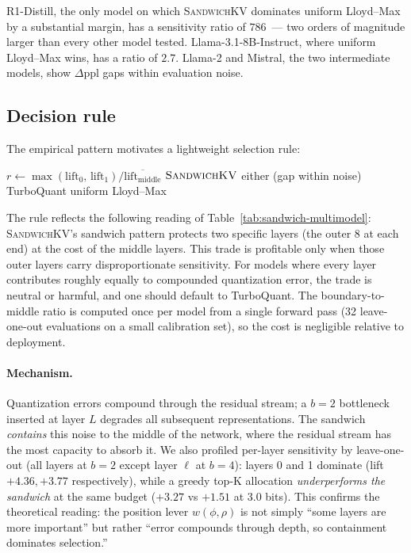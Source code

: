 \documentclass[11pt]{article}
\theoremstyle{definition}
\newcommand{\eq}{\textsc{SandwichKV}}
\begin{document}
R1-Distill, the only model on which \eq{} dominates uniform Lloyd--Max by a substantial margin, has a sensitivity ratio of $786$~--- two orders of magnitude larger than every other model tested. Llama-3.1-8B-Instruct, where uniform Lloyd--Max wins, has a ratio of $2.7$. Llama-2 and Mistral, the two intermediate models, show $\Delta\text{ppl}$ gaps within evaluation noise.

\subsection{Decision rule}
\label{sec:decision-rule}

The empirical pattern motivates a lightweight selection rule:

\begin{algorithm}[h]
\caption{$\eq{}$-or-TurboQuant decision (calibration: one forward pass)}
\begin{algorithmic}
\State $r \gets \max(\text{lift}_0,\,\text{lift}_1) / \overline{\text{lift}_{\text{middle}}}$
 \Return $\eq{}$ 
 \Return either (gap within noise) 
\Else{} \Return TurboQuant uniform Lloyd--Max 
\EndIf
\end{algorithmic}
\end{algorithm}

The rule reflects the following reading of Table~\ref{tab:sandwich-multimodel}: \eq{}'s sandwich pattern protects two specific layers (the outer 8 at each end) at the cost of the middle layers. This trade is profitable only when those outer layers carry disproportionate sensitivity. For models where every layer contributes roughly equally to compounded quantization error, the trade is neutral or harmful, and one should default to TurboQuant. The boundary-to-middle ratio is computed once per model from a single forward pass (32 leave-one-out evaluations on a small calibration set), so the cost is negligible relative to deployment.

\paragraph{Mechanism.} Quantization errors compound through the residual
stream; a $b{=}2$ bottleneck inserted at layer $L$ degrades all subsequent
representations. The sandwich \emph{contains} this noise to the middle of the
network, where the residual stream has the most capacity to absorb it. We
also profiled per-layer sensitivity by leave-one-out (all layers at $b{=}2$
except layer $\ell$ at $b{=}4$): layers 0 and 1 dominate (lift $+4.36, +3.77$
respectively), while a greedy top-K allocation \emph{underperforms the
sandwich} at the same budget ($+3.27$ vs $+1.51$ at 3.0 bits).
This confirms the theoretical reading: the position lever
$w(\phi, \rho)$ is not simply ``some layers are more important'' but rather
``error compounds through depth, so containment dominates selection.''
\end{document}
